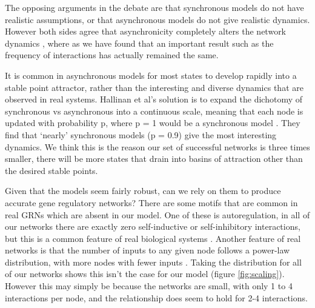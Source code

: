 \documentclass[a4paper,11pt]{article}
\begin{document}
The opposing arguments in the debate are that synchronous models do not have realistic assumptions, or that asynchronous models do not give realistic dynamics. However both sides agree that asynchronicity completely alters the network dynamics \citep{Harvey1997}, where as we have found that an important result such as the frequency of interactions has actually remained the same.
\par

It is common in asynchronous models for most states to develop rapidly into a stable point attractor, rather than the interesting and diverse dynamics that are observed in real systems. Hallinan et al's solution is to expand the dichotomy of synchronous vs asynchronous into a continuous scale, meaning that each node is updated with probability p, where p = 1 would be a synchronous model \citep{Hallinan2004}. They find that `nearly' synchronous models (p = 0.9) give the most interesting dynamics. We think this is the reason our set of successful networks is three times smaller, there will be more states that drain into basins of attraction other than the desired stable points.
\par

Given that the models seem fairly robust, can we rely on them to produce accurate gene regulatory networks? There are some motifs that are common in real GRNs which are absent in our model. One of these is autoregulation, in all of our networks there are exactly zero self-inductive or self-inhibitory interactions, but this is a common feature of real biological systems \citep{Alon2007}. Another feature of real networks is that the number of inputs to any given node follows a power-law distribution, with more nodes with fewer inputs \citep{Koonin2011}. Taking the distribution for all of our networks shows this isn't the case for our model (figure \ref{fig:scaling}). However this may simply be because the networks are small, with only 1 to 4 interactions per node, and the relationship does seem to hold for 2-4 interactions.
\par
\end{document}
